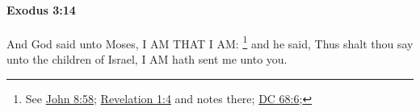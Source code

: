 
		\paragraph{Exodus 3:14} %
			\label{EXODUS-3-14}

			And God said unto Moses, I AM THAT I AM:%
				\footnote{%
					See \hyperref[JOHN-8-58]{John 8:58}; \hyperref[REVELATIONNT-1-4]{Revelation 1:4} and notes there; \hyperref[DC68-6]{DC 68:6}; 
					}
			and he said, Thus shalt thou say unto the children of Israel, I AM hath sent me unto you.

			\begin{framed}
			\scriptsize
				\begin{compactdesc}
					\item[BHS] 
				\end{compactdesc}
			\end{framed}


